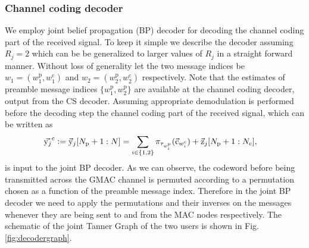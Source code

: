 \subsubsection{Channel coding decoder}
\label{sec:BP_GMAC}
We employ joint belief propagation (BP) decoder for decoding the channel coding part of the received signal. To keep it simple we describe the decoder assuming $R_j=2$ which can be be generalized to larger values of $R_j$ in a straight forward manner. Without loss of generality let the two message indices be $w_1=(w_1^\mathrm{p},w_1^\mathrm{c})$ and $w_2=(w_2^\mathrm{p},w_2^\mathrm{c})$ respectively. Note that the estimates of preamble message indices $\{w_1^\mathrm{p},w_2^\mathrm{p}\}$ are available at the channel coding decoder, output from the CS decoder. Assuming appropriate demodulation is performed before the decoding step the channel coding part of the received signal, which can be written as
\begin{align*}
\vec{\mathrm{y}_j}^{\mathrm{c}}\mathrel{\mathop:}=  \vec{\mathrm{y}}_j[N_{\mathrm{p}}+1:N] &=\sum_{i\in\{1,2\}} \pi_{\tau_{w_i^\mathrm{p}}}(\vec{\mathrm{c}}_{w_i^{\mathrm{c}}}) +\vec{\mathrm{z}}_j[N_{\mathrm{p}}+1:N_{\mathrm{c}}],
\end{align*}
is input to the joint BP decoder. As we can observe, the codeword before being transmitted across the GMAC channel is permuted according to a permutation chosen as a function of the preamble message index. Therefore in the joint BP decoder we need to apply the permutations and their inverses on the messages whenever they are being sent to and from the MAC nodes respectively. The schematic of the joint Tanner Graph of the two users is shown in Fig. \ref{fig:decodergraph}.


